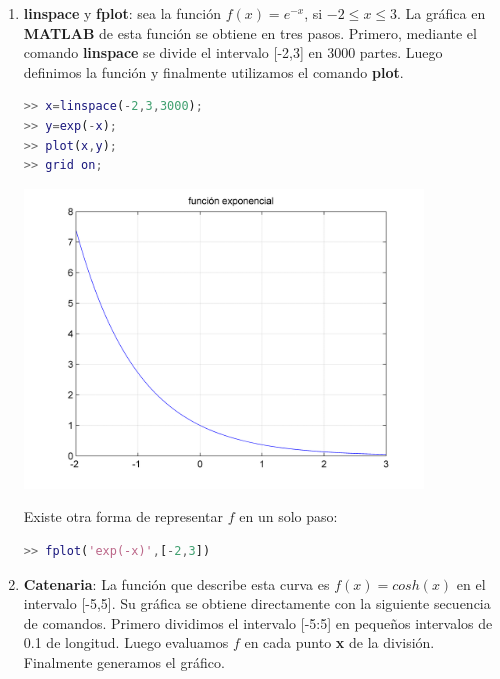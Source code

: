 \begin{enumerate}

\item \textbf{linspace} y \textbf{fplot}: sea la función $f(x)=e^{-x}$, si $-2 \leq x \leq 3$. La gráfica en \textbf{MATLAB} de esta función se obtiene en tres pasos. Primero, mediante el comando \textbf{linspace} se divide el intervalo [-2,3] en 3000 partes. Luego definimos la función y finalmente utilizamos el comando \textbf{plot}.

\begin{lstlisting}[language=Matlab]
>> x=linspace(-2,3,3000);
>> y=exp(-x);
>> plot(x,y);
>> grid on;
\end{lstlisting}
\begin{center}
\includegraphics[width=300pt]{./Imagenes/linspace.png}
\end{center} 

Existe otra forma de representar $f$ en un solo paso:
\begin{lstlisting}[language=Matlab]
>> fplot('exp(-x)',[-2,3])
\end{lstlisting}



\item \textbf{Catenaria}: La función que describe esta curva es  $f(x)=cosh(x)$ en el intervalo [-5,5]. Su gráfica se obtiene directamente con la siguiente secuencia de comandos. Primero dividimos el intervalo [-5:5] en pequeños intervalos de 0.1 de longitud. Luego evaluamos $f$ en cada punto \textbf{x} de la división. Finalmente generamos el gráfico.


\end{enumerate}
